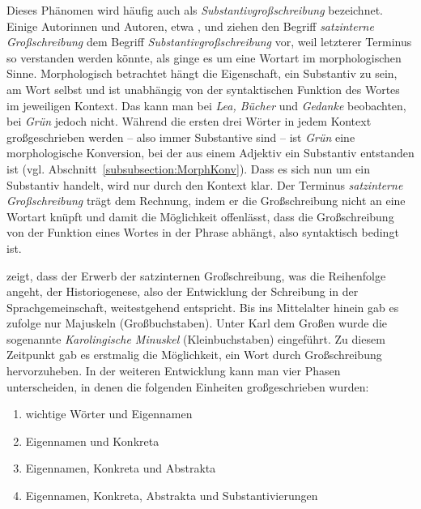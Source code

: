 Dieses Phänomen wird häufig auch als \textit{Substantivgroßschreibung} bezeichnet. Einige Autorinnen und Autoren, etwa \citet{GuentherNuenke2005}, \citet{Bredel2006} und \citet{FuhrhopPeters2013} ziehen den Begriff \textit{satzinterne Großschreibung} dem Begriff \textit{Substantivgroßschreibung} vor, weil letzterer Terminus so verstanden werden könnte, als ginge es um eine Wortart im morphologischen Sinne. Morphologisch betrachtet hängt die Eigenschaft, ein Substantiv zu sein, am Wort selbst und ist unabhängig von der syntaktischen Funktion des Wortes im jeweiligen Kontext. Das kann man bei \textit{Lea, Bücher} und \textit{Gedanke} beobachten, bei \textit{Grün} jedoch nicht. Während die ersten drei Wörter in jedem Kontext großgeschrieben werden -- also immer Substantive sind -- ist \textit{Grün} eine morphologische Konversion, bei der aus einem Adjektiv ein Substantiv entstanden ist (vgl. Abschnitt~\ref{subsubsection:MorphKonv}). Dass es sich nun um ein Substantiv handelt, wird nur durch den Kontext klar. Der Terminus \textit{satzinterne Großschreibung} trägt dem Rechnung, indem er die Großschreibung nicht an eine Wortart knüpft und damit die Möglichkeit offenlässt, dass die Großschreibung von der Funktion eines Wortes in der Phrase abhängt, also syntaktisch bedingt ist.

\citet{Bredel2006} zeigt, dass der Erwerb der satzinternen Großschreibung, was die Reihenfolge angeht, der Historiogenese, also der Entwicklung der Schreibung in der Sprachgemeinschaft, weitestgehend entspricht. Bis ins Mittelalter hinein gab es \citet[190--190]{FuhrhopPeters2013} zufolge nur Majuskeln (Großbuchstaben). Unter Karl dem Großen wurde die sogenannte \textit{Karolingische Minuskel} (Kleinbuchstaben) eingeführt. Zu diesem Zeitpunkt gab es erstmalig die Möglichkeit, ein Wort durch Großschreibung hervorzuheben. In der weiteren Entwicklung kann man vier Phasen unterscheiden, in denen die folgenden Einheiten großgeschrieben wurden:

\begin{enumerate}
    \item wichtige Wörter und Eigennamen
    \item Eigennamen und Konkreta
    \item Eigennamen, Konkreta und Abstrakta
    \item Eigennamen, Konkreta, Abstrakta und Substantivierungen
\end{enumerate}

